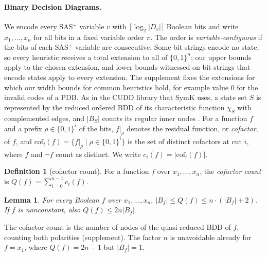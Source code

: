 \documentclass[letterpaper]{article}
\newcommand{\bddsize}[1]{\ensuremath{|B_{#1}|}}
\newcommand{\cofcount}{\ensuremath{Q}}
\newcommand{\cutcount}[2]{\ensuremath{c_{#1}(#2)}}
\newcommand{\sub}[2]{\ensuremath{\mathrm{cof}_{#1}(#2)}}
\theoremstyle{plain}
\newtheorem{lemma}{Lemma}
\theoremstyle{definition}
\newtheorem{definition}{Definition}
\theoremstyle{remark}
\begin{document}
\paragraph{Binary Decision Diagrams.}
We encode every SAS$^{+}$ variable $v$ with $\lceil\log_2|D_v|\rceil$ Boolean bits and write $x_1,\ldots,x_n$ for all bits in a fixed variable order $\pi$.
The order is \emph{variable-contiguous} if the bits of each SAS$^{+}$ variable are consecutive.
Some bit strings encode no state, so every heuristic receives a total extension to all of $\{0,1\}^n$; our upper bounds apply to the chosen extension, and lower bounds witnessed on bit strings that encode states apply to every extension.
The supplement fixes the extensions for which our width bounds for common heuristics hold, for example value $0$ for the invalid codes of a PDB.
As in the CUDD library that SymK uses, a state set $S$ is represented by the reduced ordered BDD of its characteristic function $\chi_S$ with complemented edges, and $\bddsize{S}$ counts its regular inner nodes \citep{bryant-ieeecomp1986}.
For a function $f$ and a prefix $\rho\in\{0,1\}^i$ of the bits, $f|_\rho$ denotes the residual function, or \emph{cofactor}, of $f$, and $\sub{i}{f}=\{f|_\rho\mid\rho\in\{0,1\}^i\}$ is the set of distinct cofactors at cut $i$, where $f$ and $\neg f$ count as distinct.
We write $\cutcount{i}{f}=|\sub{i}{f}|$.

\begin{definition}[cofactor count]
\label{def-cofcount}
For a function $f$ over $x_1, \dots, x_n$, the \emph{cofactor count} is $\cofcount(f) = \sum_{i=0}^{n-1} \cutcount{i}{f}$.
\end{definition}

\begin{lemma}
\label{lem-qsize}
For every Boolean $f$ over $x_1, \dots, x_n$, $\bddsize{f} \leq \cofcount(f) \leq n \cdot (\bddsize{f} + 2)$.
If $f$ is nonconstant, also $\cofcount(f)\leq2n\bddsize{f}$.
\end{lemma}

The cofactor count is the number of nodes of the quasi-reduced BDD of $f$, counting both polarities (supplement).
The factor $n$ is unavoidable already for $f=x_1$, where $\cofcount(f)=2n-1$ but $\bddsize{f}=1$.
\end{document}
